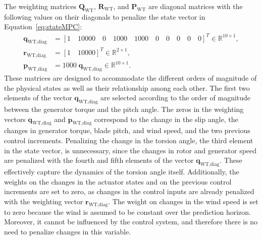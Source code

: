 The weighting matrices \( \bm{Q}_{\text{WT}} \), \( \bm{R}_{\text{WT}} \), and \( \bm{P}_{\text{WT}} \) are diagonal matrices with the following values on their diagonals to penalize the state vector in Equation~\eqref{eq:stateMPC}:
\begin{align}
    \bm{q}_{\text{WT,diag}} &= [1 \quad 10000 \quad 0 \quad 1000 \quad 1000 \quad 0 \quad 0 \quad 0 \quad 0 \quad 0]^T \in \mathbb{R}^{10 \times 1}, \\
    \bm{r}_{\text{WT,diag}} &= [1 \quad 10000]^T \in \mathbb{R}^{2 \times 1}, \\
    \bm{p}_{\text{WT,diag}} &= 1000 \; \bm{q}_{\text{WT,diag}} \in \mathbb{R}^{10 \times 1}.
\end{align}
%
These matrices are designed to accommodate the different orders of magnitude of the physical states as well as their relationship among each other. The first two elements of the vector $\bm{q}_{\text{WT,diag}}$ are selected according to the order of magnitude between the generator torque and the pitch angle. The zeros in the weighting vectors $\bm{q}_{\text{WT,diag}}$ and $\bm{p}_{\text{WT,diag}}$ correspond to the change in the slip angle, the changes in generator torque, blade pitch, and wind speed, and the two previous control increments. Penalizing the change in the torsion angle, the third element in the state vector, is unnecessary, since the changes in rotor and generator speed are penalized with the fourth and fifth elements of the vector $\bm{q}_{\text{WT,diag}}$. These effectively capture the dynamics of the torsion angle itself. Additionally, the weights on the changes in the actuator states and on the previous control increments are set to zero, as changes in the control inputs are already penalized with the weighting vector $\bm{r}_{\text{WT,diag}}$. The weight on changes in the wind speed is set to zero because the wind is assumed to be constant over the prediction horizon. Moreover, it cannot be influenced by the control system, and therefore there is no need to penalize changes in this variable.

